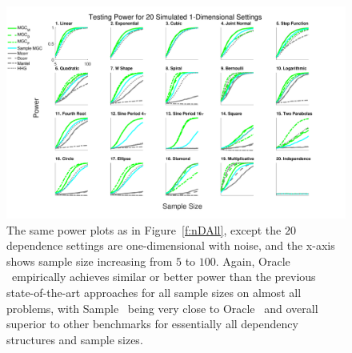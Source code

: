 \documentclass[11pt]{article}
\begin{document}
\begin{figure}[htbp]
\includegraphics[width=1.0\textwidth,trim={0 0.5cm 3.2cm 0},clip]{Figures/Fig1DPowerAll}
\caption{
The same power plots as in Figure~\ref{f:nDAll}, except the $20$ dependence settings are one-dimensional with noise, and the x-axis shows sample size increasing from $5$ to $100$. 
Again, Oracle \Mgc~empirically achieves similar or better power than the previous state-of-the-art approaches for all sample sizes on almost all problems, with Sample \Mgc~being very close to Oracle \Mgc~and overall superior to other benchmarks for essentially all dependency structures and sample sizes.}
\label{f:1DAll}
\end{figure}
\end{document}
